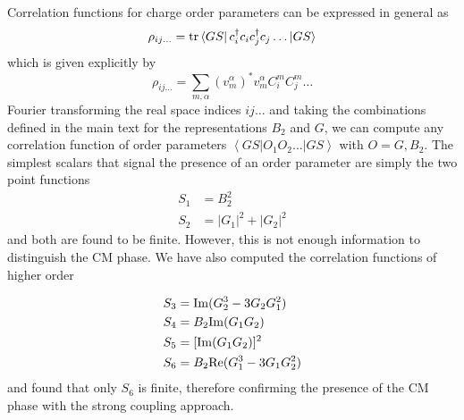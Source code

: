\documentclass[aps,prx,10pt,twocolumn,floatfix,superscriptaddress,showpacs,numerical,footinbib]{revtex4-1}
\begin{document}
Correlation functions for charge order parameters can be expressed in general as
\begin{equation}
\rho_{ij\ldots} = {\rm tr} \left< GS \right| c^\dagger_i c_ic^\dagger_j c_j \ldots \left| GS \right> 
\end{equation}
which is given explicitly by
\begin{equation}
\rho_{ij\ldots} = \sum_{m,\alpha} (v_m^\alpha)^*v_m^\alpha C^m_i C^m_j \dots
\end{equation}
Fourier transforming the real space indices $ij\ldots$ and taking the combinations defined in the main text for the representations $B_2$ and $G$, we can compute any correlation function of order parameters $\left< GS \right| O_1 O_2 \ldots \left| GS \right> $ with $O = G, B_2$. 
%
The simplest scalars that signal the presence of an order parameter are simply the two point functions
\begin{align}
S_1 &= B_2^2 \\
S_2 &= |G_1|^2+|G_2|^2 
\end{align}
and both are found to be finite. However, this is not enough information to distinguish the CM phase. We have also computed the correlation functions of higher order


\begin{align}
S_3 &= {\rm Im}(G_2^3-3G_2 G_1^2)  \\
S_4 &= B_2 {\rm Im}(G_1G_2) \\
S_5 &= [{\rm Im}(G_1G_2)]^2 \\
S_6 &= B_2{\rm Re}(G_1^3-3G_1 G_2^2)
\end{align}
and found that only $S_6$ is finite, therefore confirming the presence of the CM phase with the strong coupling approach. 


\end{document}
